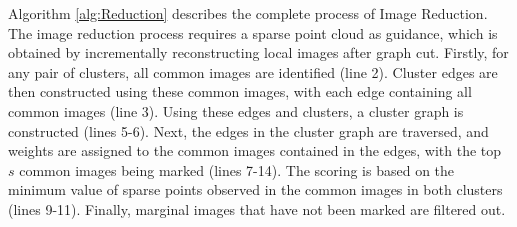 \documentclass[runningheads]{llncs}
\begin{document}
Algorithm \ref{alg:Reduction} describes the complete process of Image Reduction. The image reduction process requires a sparse point cloud as guidance, which is obtained by incrementally reconstructing local images after graph cut. Firstly, for any pair of clusters, all common images are identified (line 2). Cluster edges are then constructed using these common images, with each edge containing all common images (line 3). Using these edges and clusters, a cluster graph is constructed (lines 5-6). Next, the edges in the cluster graph are traversed, and weights are assigned to the common images contained in the edges, with the top $s$ common images being marked (lines 7-14). The scoring is based on the minimum value of sparse points observed in the common images in both clusters (lines 9-11). Finally, marginal images that have not been marked are filtered out.
\end{document}
